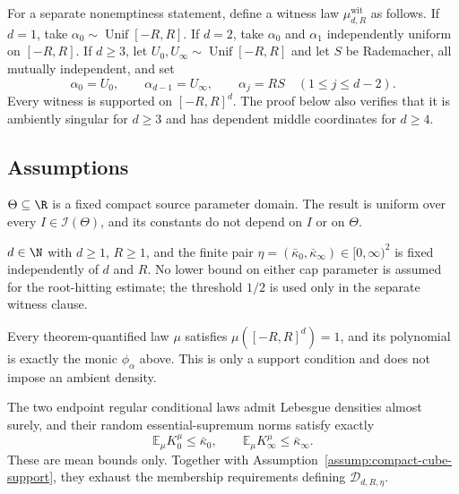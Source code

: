 For a separate nonemptiness statement, define a witness law
$\mu^{\mathrm{wit}}_{d,R}$ as follows.  If $d=1$, take
$\alpha_0\sim\operatorname{Unif}[-R,R]$.  If $d=2$, take
$\alpha_0$ and $\alpha_1$ independently uniform on $[-R,R]$.  If $d\geq3$,
let $U_0,U_\infty\sim\operatorname{Unif}[-R,R]$ and let $S$ be Rademacher,
all mutually independent, and set
\[
\alpha_0=U_0,\qquad \alpha_{d-1}=U_\infty,
\qquad \alpha_j=RS\quad(1\leq j\leq d-2).
\]
Every witness is supported on $[-R,R]^d$.  The proof below also verifies
that it is ambiently singular for $d\geq3$ and has dependent middle
coordinates for $d\geq4$.

\subsection{Assumptions}

\begin{assumption}
\label{assump:compact-parameter-domain}
$\Theta\subseteq\R$ is a fixed compact source parameter domain.  The result
is uniform over every $I\in\mathcal I(\Theta)$, and its constants do not
depend on $I$ or on $\Theta$.
\end{assumption}

\begin{assumption}
\label{assump:indexed-regime}
$d\in\N$ with $d\geq1$, $R\geq1$, and the finite pair
$\eta=(\bar\kappa_0,\bar\kappa_\infty)\in[0,\infty)^2$ is fixed
independently of $d$ and $R$.  No lower bound on either cap parameter is
assumed for the root-hitting estimate; the threshold $1/2$ is used only in
the separate witness clause.
\end{assumption}

\begin{assumption}
\label{assump:compact-cube-support}
Every theorem-quantified law $\mu$ satisfies $\mu([-R,R]^d)=1$, and its
polynomial is exactly the monic $\phi_\alpha$ above.  This is only a support
condition and does not impose an ambient density.
\end{assumption}

\begin{assumption}
\label{assump:mean-endpoint-conditional-caps}
The two endpoint regular conditional laws admit Lebesgue densities almost
surely, and their random essential-supremum norms satisfy exactly
\[
\mathbb E_\mu K_0^\mu\leq\bar\kappa_0,
\qquad
\mathbb E_\mu K_\infty^\mu\leq\bar\kappa_\infty.
\]
These are mean bounds only.  Together with
Assumption~\ref{assump:compact-cube-support}, they exhaust the membership
requirements defining $\mathcal D_{d,R,\eta}$.
\end{assumption}

